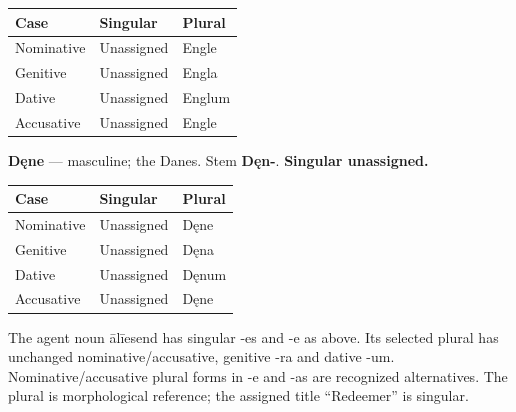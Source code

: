 \par\begingroup
\fontsize{10.5}{13.2}\selectfont
\setlength{\LTleft}{0pt}\setlength{\LTright}{\fill}
\noindent
\begin{tabular}{@{}>{\raggedright\arraybackslash}p{39.46mm}>{\raggedright\arraybackslash}p{39.46mm}>{\raggedright\arraybackslash}p{39.46mm}@{}}
\toprule
\textbf{Case} & \textbf{Singular} & \textbf{Plural} \\
\midrule
Nominative & Unassigned & Engle \\
Genitive & Unassigned & Engla \\
Dative & Unassigned & Englum \\
Accusative & Unassigned & Engle \\
\bottomrule
\end{tabular}
\par\endgroup

\textbf{Dęne} — masculine; the Danes. Stem \textbf{Dęn-}. \textbf{Singular unassigned.}

\par\begingroup
\fontsize{10.5}{13.2}\selectfont
\setlength{\LTleft}{0pt}\setlength{\LTright}{\fill}
\noindent
\begin{tabular}{@{}>{\raggedright\arraybackslash}p{39.46mm}>{\raggedright\arraybackslash}p{39.46mm}>{\raggedright\arraybackslash}p{39.46mm}@{}}
\toprule
\textbf{Case} & \textbf{Singular} & \textbf{Plural} \\
\midrule
Nominative & Unassigned & Dęne \\
Genitive & Unassigned & Dęna \\
Dative & Unassigned & Dęnum \\
Accusative & Unassigned & Dęne \\
\bottomrule
\end{tabular}
\par\endgroup

The agent noun ālīesend has singular -es and -e as above. Its selected plural has unchanged nominative/\allowbreak{}accusative, genitive -ra and dative -um. Nominative/\allowbreak{}accusative plural forms in -e and -as are recognized alternatives. The plural is morphological reference; the assigned title “Redeemer” is singular.

